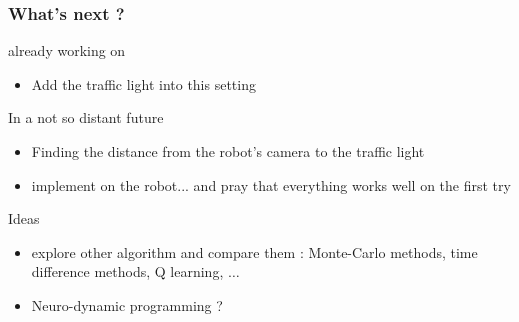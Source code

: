 \documentclass[dvipsnames,svgnames]{beamer}
\begin{document}
\begin{frame}
\frametitle{What's next ? }



\begin{block}{already working on}
\begin{itemize}
\item Add the traffic light into this setting
\end{itemize}
\end{block}

\begin{block}{In a not so distant future}
\begin{itemize}
\item Finding the distance from the robot's camera to the traffic light
\item implement on the robot... \pause and pray that everything works well on the first try 
\end{itemize}

\end{block}
\pause
\begin{block}{Ideas}

\begin{itemize}
\item explore other algorithm and compare them : Monte-Carlo methods, time difference methods, Q learning, $\ldots$
\item Neuro-dynamic programming ?
\end{itemize}

\end{block}


\end{frame}
\end{document}

